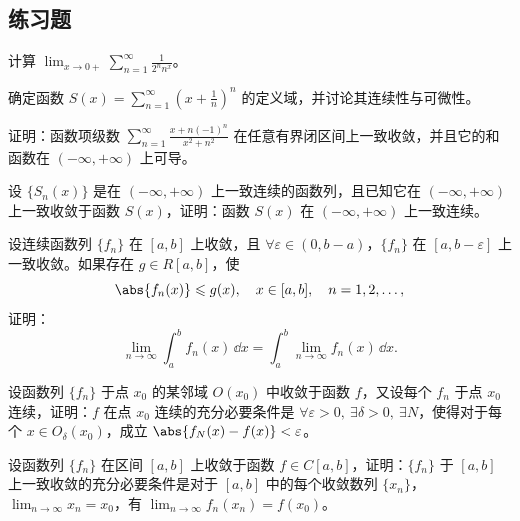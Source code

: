 \subsection{练习题}

\begin{xexercise}[1]
计算 $\displaystyle\lim_{x\to0+}\sum_{n=1}^{\infty}\frac1{2^n n^x}$。
\end{xexercise}

\begin{xexercise}[2]
确定函数 $\displaystyle S(x)=\sum_{n=1}^{\infty}\left(x+\frac1n\right)^n$ 的定义域，并讨论其连续性与可微性。
\end{xexercise}

\begin{xexercise}[3]
证明：函数项级数 $\displaystyle\sum_{n=1}^{\infty}\frac{x+n(-1)^n}{x^2+n^2}$ 在任意有界闭区间上一致收敛，并且它的和函数在 $(-\infty,+\infty)$ 上可导。
\end{xexercise}

\begin{xexercise}[4]
设 $\{S_n(x)\}$ 是在 $(-\infty,+\infty)$ 上一致连续的函数列，且已知它在 $(-\infty,+\infty)$ 上一致收敛于函数 $S(x)$，证明：函数 $S(x)$ 在 $(-\infty,+\infty)$ 上一致连续。
\end{xexercise}

\begin{xexercise}[5]
设连续函数列 $\{f_n\}$ 在 $[a,b]$ 上收敛，且 $\forall\varepsilon\in(0,b-a)$，$\{f_n\}$ 在 $[a,b-\varepsilon]$ 上一致收敛。如果存在 $g\in R[a,b]$，使
  \[
    \abs{f_n(x)}\leqslant g(x),\quad x\in[a,b],\quad n=1,2,\ldots,
  \]
  证明：
  \[
    \lim_{n\to\infty}\int_a^b f_n(x)\,\dd x=\int_a^b\lim_{n\to\infty}f_n(x)\,\dd x.
  \]
\end{xexercise}

\begin{xexercise}[6]
设函数列 $\{f_n\}$ 于点 $x_0$ 的某邻域 $O(x_0)$ 中收敛于函数 $f$，又设每个 $f_n$ 于点 $x_0$ 连续，证明：$f$ 在点 $x_0$ 连续的充分必要条件是 $\forall\varepsilon>0,\ \exists\delta>0,\ \exists N$，使得对于每个 $x\in O_\delta(x_0)$，成立 $\abs{f_N(x)-f(x)}<\varepsilon$。
\end{xexercise}

\begin{xexercise}[7]
设函数列 $\{f_n\}$ 在区间 $[a,b]$ 上收敛于函数 $f\in C[a,b]$，证明：$\{f_n\}$ 于 $[a,b]$ 上一致收敛的充分必要条件是对于 $[a,b]$ 中的每个收敛数列 $\{x_n\}$，$\displaystyle\lim_{n\to\infty}x_n=x_0$，有 $\displaystyle\lim_{n\to\infty}f_n(x_n)=f(x_0)$。
\end{xexercise}

